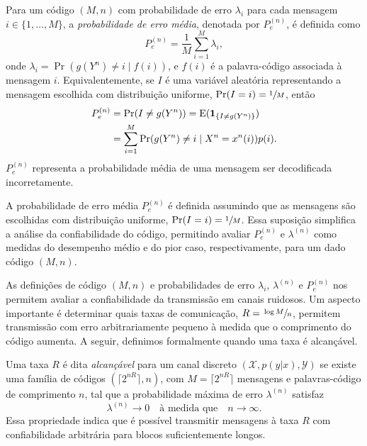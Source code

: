 \begin{definition}
Para um código $(M,n)$ com probabilidade de erro $\lambda_i$ para cada mensagem $i \in \{1, \ldots, M\}$, 
a \emph{probabilidade de erro média}, denotada por $P_e^{(n)}$, é definida como
\begin{equation}
P_e^{(n)} = \frac{1}{M} \sum_{i=1}^M \lambda_i,
\end{equation}
onde $\lambda_i = \Pr(g(Y^n) \neq i \mid f(i))$, e $f(i)$ é a palavra-código associada à mensagem $i$. 
Equivalentemente, se $I$ é uma variável aleatória representando a mensagem escolhida com distribuição uniforme, $\Pr(I=i) = \sfrac{1}{M}$, então
\begin{subequations}
  \begin{align}
  P_e^{(n)} &= \Pr(I \neq g(Y^n)) = \mathrm{E} ( \mathbf{1}_{\{I \neq g(Y^n)\}} ) \\
            &= \sum_{i=1}^M \Pr(g(Y^n) \neq i \mid X^n = x^n(i)) p(i) .
  \end{align}
\end{subequations}
$P_e^{(n)}$ representa a probabilidade média de uma mensagem ser decodificada incorretamente.
\end{definition}


\begin{remark}
A probabilidade de erro média $P_e^{(n)}$ é definida assumindo que as mensagens são escolhidas com distribuição uniforme, 
$\Pr(I=i) = \sfrac{1}{M}$. Essa suposição simplifica a análise da confiabilidade do código, permitindo avaliar $P_e^{(n)}$ e 
$\lambda^{(n)}$ como medidas do desempenho médio e do pior caso, respectivamente, para um dado código $(M,n)$.
\end{remark}


As definições de código $(M,n)$ e probabilidades de erro $\lambda_i$,
$\lambda^{(n)}$ e $P_e^{(n)}$ nos permitem avaliar a confiabilidade da
transmissão em canais ruidosos. Um aspecto importante é determinar quais taxas
de comunicação, $R = \sfrac{\log M}{n}$, permitem transmissão com erro
arbitrariamente pequeno à medida que o comprimento do código aumenta. A seguir,
definimos formalmente quando uma taxa é alcançável.

\begin{definition}
Uma taxa $R$ é dita \emph{alcançável} para um canal discreto $(\mathcal{X}, p(y|x), \mathcal{Y})$ 
se existe uma família de códigos $(\lceil 2^{nR} \rceil, n)$, com $M = \lceil 2^{nR} \rceil$ mensagens e 
palavras-código de comprimento $n$, tal que a probabilidade máxima de erro $\lambda^{(n)}$ satisfaz
\begin{equation}\label{eq:txcondalcancavel}
\lambda^{(n)} \to 0 \quad \text{à medida que} \quad n \to \infty.
\end{equation}
Essa propriedade indica que é possível transmitir mensagens à taxa $R$ com confiabilidade arbitrária para blocos suficientemente longos.
\end{definition}







